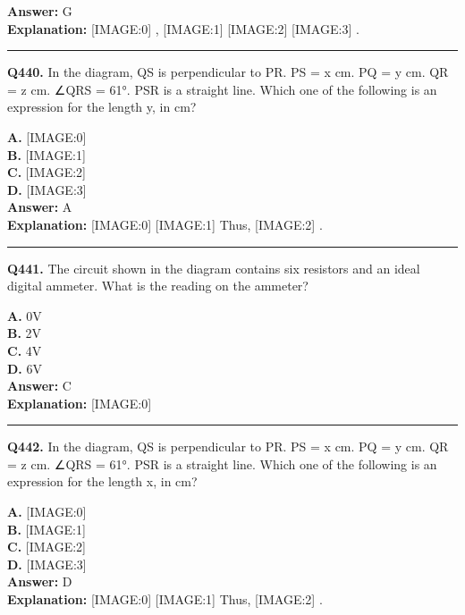 \documentclass[12pt]{article}
\begin{document}
\textbf{Answer:} G \\
\textbf{Explanation:} [IMAGE:0]
,
[IMAGE:1]
[IMAGE:2]
[IMAGE:3]
.

\hrule
\vspace{1em}


\noindent
\textbf{Q440.} In the diagram, QS is perpendicular to PR. PS = x cm. PQ = y cm. QR = z cm. ∠QRS = 61°. PSR is a straight line.
Which one of the following is an expression for the length y, in cm?



\textbf{A.} [IMAGE:0] \\
\textbf{B.} [IMAGE:1] \\
\textbf{C.} [IMAGE:2] \\
\textbf{D.} [IMAGE:3] \\

\textbf{Answer:} A \\
\textbf{Explanation:} [IMAGE:0]
[IMAGE:1]
Thus,
[IMAGE:2]
.

\hrule
\vspace{1em}


\noindent
\textbf{Q441.} The circuit shown in the diagram contains six resistors and an ideal digital ammeter.
What is the reading on the ammeter?



\textbf{A.} 0V \\
\textbf{B.} 2V \\
\textbf{C.} 4V \\
\textbf{D.} 6V \\

\textbf{Answer:} C \\
\textbf{Explanation:} [IMAGE:0]

\hrule
\vspace{1em}


\noindent
\textbf{Q442.} In the diagram, QS is perpendicular to PR. PS = x cm. PQ = y cm. QR = z cm. ∠QRS = 61°. PSR is a straight line.
Which one of the following is an expression for the length x, in cm?



\textbf{A.} [IMAGE:0] \\
\textbf{B.} [IMAGE:1] \\
\textbf{C.} [IMAGE:2] \\
\textbf{D.} [IMAGE:3] \\

\textbf{Answer:} D \\
\textbf{Explanation:} [IMAGE:0]
[IMAGE:1]
Thus,
[IMAGE:2]
.
\end{document}
